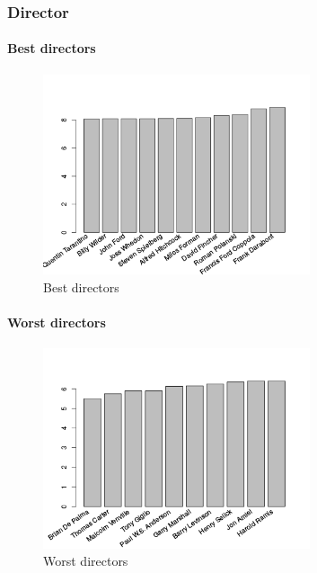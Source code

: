 \subsubsection{Director}
\label{subs:Director}

\paragraph{Best directors}
\label{par:bestDirectors}


\begin{figure}[!h]
\begin{center}
\includegraphics[width=0.70\textwidth]{../src/pre-processing/stats/results/bestDirectors.png}
\end{center}
\caption{Best directors}
\label{fig:bestDirectors}
\end{figure}

\paragraph{Worst directors}
\label{par:worstDirectors}

\begin{figure}[!h]
\begin{center}
\includegraphics[width=0.70\textwidth]{../src/pre-processing/stats/results/worstDirectors.png}
\end{center}
\caption{Worst directors}
\label{fig:worstDirectors}
\end{figure}

